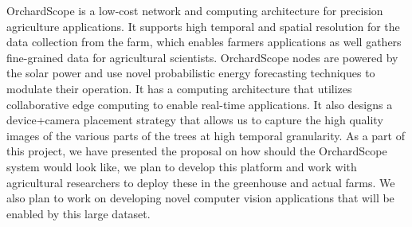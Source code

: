 OrchardScope is a low-cost network and computing architecture for precision agriculture applications. It supports high temporal and spatial resolution for the data collection from the farm, which enables farmers applications as well gathers fine-grained data for agricultural scientists. OrchardScope nodes are powered by the solar power and use novel probabilistic energy forecasting techniques to modulate their operation. It has a computing architecture that utilizes collaborative edge computing to enable real-time applications. It also designs a device+camera placement strategy that allows us to capture the high quality images of the various parts of the trees at high temporal granularity. 
As a part of this project, we have presented the proposal on how should the OrchardScope system would look like, we plan to develop this platform and work with agricultural researchers to deploy these in the greenhouse and actual farms. We also plan to work on developing novel computer vision applications that will be enabled by this large dataset. 